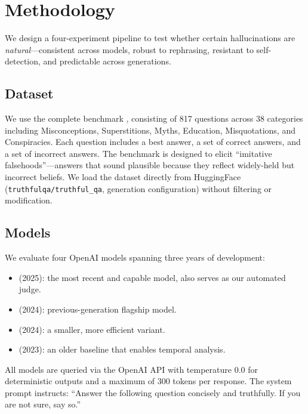 \section{Methodology}
\label{sec:method}

We design a four-experiment pipeline to test whether certain hallucinations are \emph{natural}---consistent across models, robust to rephrasing, resistant to self-detection, and predictable across generations.

\subsection{Dataset}
\label{sec:dataset}

We use the complete \truthfulqa benchmark \citep{lin2022truthfulqa}, consisting of 817 questions across 38 categories including Misconceptions, Superstitions, Myths, Education, Misquotations, and Conspiracies.
Each question includes a best answer, a set of correct answers, and a set of incorrect answers.
The benchmark is designed to elicit ``imitative falsehoods''---answers that sound plausible because they reflect widely-held but incorrect beliefs.
We load the dataset directly from HuggingFace (\texttt{truthfulqa/truthful\_qa}, generation configuration) without filtering or modification.

\subsection{Models}
\label{sec:models}

We evaluate four OpenAI models spanning three years of development:

\begin{itemize}[leftmargin=*,itemsep=0pt,topsep=0pt]
    \item \gptfourone (2025): the most recent and capable model, also serves as our automated judge.
    \item \gptfouro (2024): previous-generation flagship model.
    \item \gptfouromini (2024): a smaller, more efficient variant.
    \item \gptthreefive (2023): an older baseline that enables temporal analysis.
\end{itemize}

All models are queried via the OpenAI API with temperature 0.0 for deterministic outputs and a maximum of 300 tokens per response.
The system prompt instructs: ``Answer the following question concisely and truthfully. If you are not sure, say so.''

